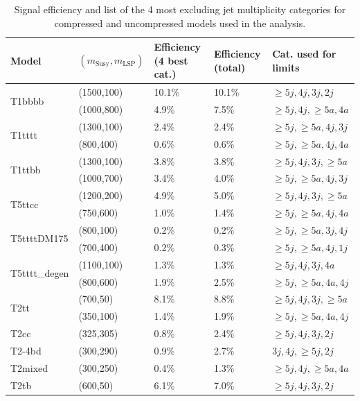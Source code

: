 \begin{table}[h!]
  \caption{
    Signal efficiency and list of the 4 most excluding jet multiplicity categories
    for compressed and uncompressed models used in the analysis.
  }
  \label{tab:sig-eff-bestCat}
  \centering
  \begin{tabular}{ lllll }
    \hline
    \hline
    Model & $(m_{\mathrm{Susy}},m_{\mathrm{LSP}})$ & Efficiency (4 best cat.) & Efficiency (total) & Cat. used for limits \\ 
    \hline
    \multirow{2}{*}{T1bbbb}
     & (1500,100) & 10.1\%  & 10.1\%  & $\geq5j,4j,3j,2j$ \\
     & (1000,800) & 4.9\%   & 7.5\%   & $\geq5j,4j,\geq5a,4a$ \\ \hline
    \multirow{2}{*}{T1tttt}
     & (1300,100) & 2.4\%   & 2.4\% & $\geq5j,\geq5a,4j,3j$ \\
     & (800,400)  & 0.6\%   & 0.6\% & $\geq5j,\geq5a,4j,4a$ \\ \hline
    \multirow{2}{*}{T1ttbb}
     & (1300,100) & 3.8\%   & 3.8\% & $\geq5j,4j,3j,\geq5a$ \\
     & (1000,700) & 3.4\%   & 4.0\% & $\geq5j,\geq5a,4j,3j$ \\ \hline
    \multirow{2}{*}{T5ttcc}
     & (1200,200) & 4.9\%   & 5.0\% & $\geq5j,4j,3j,\geq5a$ \\
     & (750,600)  & 1.0\%   & 1.4\% & $\geq5j,\geq5a,4j,4a$ \\ \hline
    \multirow{2}{*}{T5ttttDM175}
     & (800,100)  & 0.2\%   & 0.2\% & $\geq5j,\geq5a,3j,4j$ \\
     & (700,400)  & 0.2\%   & 0.3\% & $\geq5j,\geq5a,4j,1j$ \\ \hline
    \multirow{2}{*}{T5tttt\_degen}
     & (1100,100) & 1.3\%   & 1.3\% & $\geq5j,4j,3j,4a$ \\
     & (800,600)  & 1.9\%   & 2.5\% & $\geq5j,\geq5a,4a,4j$ \\ \hline
    \multirow{2}{*}{T2tt}
     & (700,50)   & 8.1\%   & 8.8\% & $\geq5j,4j,3j,\geq5a$ \\
     & (350,100)  & 1.4\%   & 1.9\% & $\geq5j,\geq5a,4a,4j$ \\ \hline
    T2cc & (325,305)   & 0.8\%   & 2.4\% & $\geq5j,4j,3j,2j$ \\ \hline
    T2-4bd & (300,290) & 0.9\%   & 2.7\% & $3j,4j,\geq5j,2j$ \\ \hline
    T2mixed & (300,250)& 0.4\%   & 1.3\% & $\geq5j,4j,\geq5a,4a$ \\ \hline
    \multirow{2}{*}{T2tb}
     & (600,50)   & 6.1\%   & 7.0\% & $\geq5j,4j,3j,2j$ \\

\end{tabular}
\end{table}
